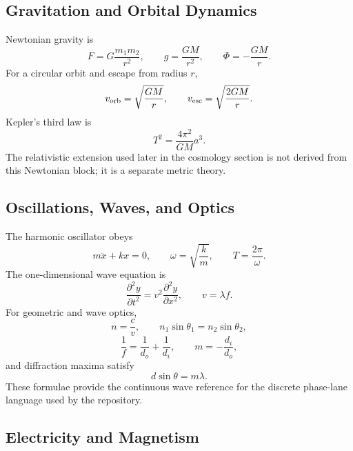 \documentclass[11pt]{article}
\begin{document}
\subsection{Gravitation and Orbital Dynamics}

Newtonian gravity is
\begin{equation}
    F=G\frac{m_1m_2}{r^2},\qquad
    g=\frac{GM}{r^2},\qquad
    \Phi=-\frac{GM}{r}.
\end{equation}
For a circular orbit and escape from radius $r$,
\begin{equation}
    v_{\rm orb}=\sqrt{\frac{GM}{r}},
    \qquad
    v_{\rm esc}=\sqrt{\frac{2GM}{r}}.
\end{equation}
Kepler's third law is
\begin{equation}
    T^2=\frac{4\pi^2}{GM}a^3.
\end{equation}
The relativistic extension used later in the cosmology section is not derived
from this Newtonian block; it is a separate metric theory.

\subsection{Oscillations, Waves, and Optics}

The harmonic oscillator obeys
\begin{equation}
    m\ddot{x}+kx=0,\qquad
    \omega=\sqrt{\frac{k}{m}},\qquad
    T=\frac{2\pi}{\omega}.
\end{equation}
The one-dimensional wave equation is
\begin{equation}
    \frac{\partial^2 y}{\partial t^2}
    =
    v^2\frac{\partial^2 y}{\partial x^2},
    \qquad
    v=\lambda f.
\end{equation}
For geometric and wave optics,
\begin{equation}
    n=\frac{c}{v},\qquad
    n_1\sin\theta_1=n_2\sin\theta_2,
\end{equation}
\begin{equation}
    \frac{1}{f}=\frac{1}{d_o}+\frac{1}{d_i},
    \qquad
    m=-\frac{d_i}{d_o},
\end{equation}
and diffraction maxima satisfy
\begin{equation}
    d\sin\theta=m\lambda.
\end{equation}
These formulae provide the continuous wave reference for the discrete
phase-lane language used by the repository.

\subsection{Electricity and Magnetism}
\end{document}
